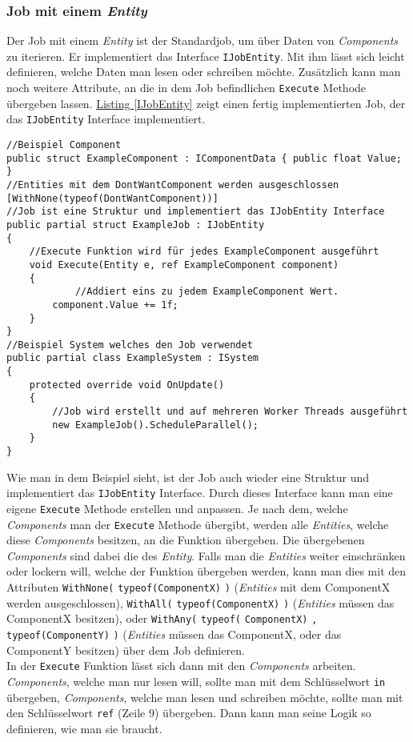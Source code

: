 \subsubsection{Job mit einem \textit{Entity}}
Der Job mit einem \textit{Entity} ist der Standardjob, um über Daten von \textit{Components} zu iterieren. Er implementiert das Interface \texttt{IJobEntity}. Mit ihm lässt sich leicht definieren, welche Daten man lesen oder schreiben möchte. Zusätzlich kann man noch weitere Attribute, an die in dem Job befindlichen \texttt{Execute} Methode übergeben lassen. \hyperref[IJobEntity]{Listing \ref*{IJobEntity}} zeigt einen fertig implementierten Job, der das \texttt{IJobEntity} Interface implementiert.
\begin{lstlisting}[style=code, caption={[Beispiel für einen Job mit einem \textit{Entity} für eine einfache Addition]Beispiel für einen Job mit einem \textit{Entity} für eine einfache Addition. Der \texttt{Execute} Methode wird das \textit{Entity} und das \texttt{ExampleComponent} übergeben.}, label=IJobEntity]
//Beispiel Component
public struct ExampleComponent : IComponentData { public float Value; }
//Entities mit dem DontWantComponent werden ausgeschlossen
[WithNone(typeof(DontWantComponent))]
//Job ist eine Struktur und implementiert das IJobEntity Interface
public partial struct ExampleJob : IJobEntity
{
    //Execute Funktion wird für jedes ExampleComponent ausgeführt
    void Execute(Entity e, ref ExampleComponent component)
    {
    		//Addiert eins zu jedem ExampleComponent Wert.
        component.Value += 1f;
    }
}
//Beispiel System welches den Job verwendet
public partial class ExampleSystem : ISystem
{
    protected override void OnUpdate()
    {
        //Job wird erstellt und auf mehreren Worker Threads ausgeführt
        new ExampleJob().ScheduleParallel();
    }
}
\end{lstlisting}
Wie man in dem Beispiel sieht, ist der Job auch wieder eine Struktur und implementiert das \texttt{IJobEntity} Interface. Durch dieses Interface kann man eine eigene \texttt{Execute} Methode erstellen und anpassen. Je nach dem, welche \textit{Components} man der \texttt{Execute} Methode übergibt, werden alle \textit{Entities}, welche diese \textit{Components} besitzen, an die Funktion übergeben. Die übergebenen \textit{Components} sind dabei die des \textit{Entity}. Falls man die \textit{Entities} weiter einschränken oder lockern will, welche der Funktion übergeben werden, kann man dies mit den Attributen \texttt{WithNone(} \texttt{typeof(ComponentX)} \texttt{)} (\textit{Entities} mit dem ComponentX werden ausgeschlossen), \texttt{WithAll(} \texttt{typeof(ComponentX)} \texttt{)} (\textit{Entities} müssen das ComponentX besitzen), oder \texttt{WithAny(} \texttt{typeof(} \texttt{ComponentX)} \texttt{,} \texttt{typeof(ComponentY)} \texttt{)} (\textit{Entities} müssen das ComponentX, oder das ComponentY besitzen) über dem Job definieren.\\
In der \texttt{Execute} Funktion lässt sich dann mit den \textit{Components} arbeiten. \textit{Components}, welche man nur lesen will, sollte man mit dem Schlüsselwort \texttt{in} übergeben, \textit{Components}, welche man lesen und schreiben möchte, sollte man mit den Schlüsselwort \texttt{ref} (Zeile 9) übergeben. Dann kann man seine Logik so definieren, wie man sie braucht.
